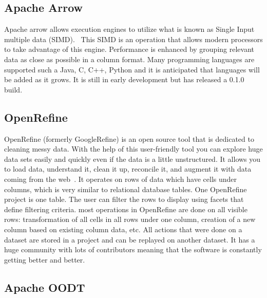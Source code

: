 \subsection{Apache Arrow \cv}
     
Apache arrow allows execution engines to utilize what is known as
Single Input multiple data (SIMD).~\cite{www-arrow} This SIMD is an
operation that allows modern processors to take advantage of this
engine.  Performance is enhanced by grouping relevant data as close as
possible in a column format.  Many programming languages are supported
such a Java, C, C++, Python and it is anticipated that languages will
be added as it grows.  It is still in early development but has
released a 0.1.0 build.

\subsection{OpenRefine}

OpenRefine (formerly GoogleRefine) is an open source tool that is
dedicated to cleaning messy data. With the help of this user-friendly
tool you can explore huge data sets easily and quickly even if the
data is a little unstructured. It allows you to load data, understand
it, clean it up, reconcile it, and augment it with data coming from
the web~\cite{www-openrefine}. It operates on rows of data which have
cells under columns, which is very similar to relational database
tables. One OpenRefine project is one table. The user can filter the
rows to display using facets that define filtering criteria. most
operations in OpenRefine are done on all visible rows: transformation
of all cells in all rows under one column, creation of a new column
based on existing column data, etc. All actions that were done on a
dataset are stored in a project and can be replayed on another
dataset. It has a huge community with lots of contributors meaning
that the software is constantly getting better and better.

\subsection{Apache OODT \cv}

